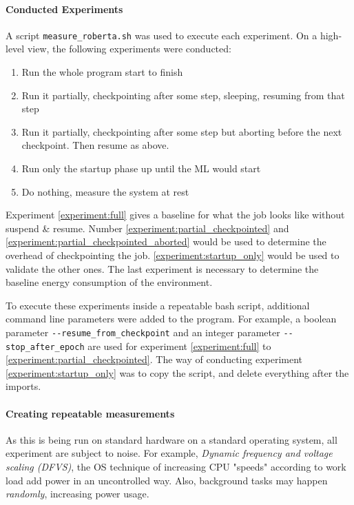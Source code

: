 \paragraph{Conducted Experiments}

A script \verb|measure_roberta.sh| was used to execute each experiment. 
On a high-level view, the following experiments were conducted: 

\begin{enumerate}
    \item \label{experiment:full}Run the whole program start to finish
    \item \label{experiment:partial_checkpointed}Run it partially, checkpointing after some step, sleeping, resuming from that step
    \item \label{experiment:partial_checkpointed_aborted}Run it partially, checkpointing after some step but aborting before the next checkpoint. Then resume as above.
    \item \label{experiment:startup_only}Run only the startup phase up until the ML would start
    \item \label{experiment:baseline}Do nothing, measure the system at rest
\end{enumerate}

Experiment \ref{experiment:full} gives a baseline for what the job looks like without suspend \& resume. Number \ref{experiment:partial_checkpointed} and \ref{experiment:partial_checkpointed_aborted} would be used to determine the overhead of checkpointing the job. \ref{experiment:startup_only} would be used to validate the other ones. The last experiment is necessary to determine the baseline energy consumption of the environment.

To execute these experiments inside a repeatable bash script, additional command line parameters were added to the program. 
For example, a boolean parameter \verb|--resume_from_checkpoint| and an integer parameter \verb|--stop_after_epoch| are used for experiment \ref{experiment:full} to \ref{experiment:partial_checkpointed}. 
The way of conducting experiment \ref{experiment:startup_only} was to copy the script, and delete everything after the imports.

\paragraph{Creating repeatable measurements}

As this is being run on standard hardware on a standard operating system, all experiment are subject to noise. 
For example, \emph{Dynamic frequency and voltage scaling (DFVS)}, the OS technique of increasing CPU "speeds" according to work load add power in an uncontrolled way. Also, background tasks may happen \emph{randomly}, increasing power usage. 

